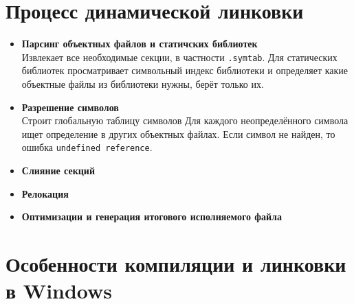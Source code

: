 \documentclass{article}
\begin{document}
\section{Процесс динамической линковки}
\begin{itemize}
\item \textbf{Парсинг объектных файлов и статичских библиотек}\\
Извлекает все необходимые секции, в частности \texttt{.symtab}. Для статических библиотек просматривает символьный индекс библиотеки и определяет какие объектные файлы из библиотеки нужны, берёт только их.

\item \textbf{Разрешение символов}\\
Строит глобальную таблицу символов
Для каждого неопределённого символа ищет определение в других объектных файлах.
Если символ не найден, то ошибка \texttt{undefined reference}.

\item \textbf{Слияние секций}\\

\item \textbf{Релокация}\\

\item \textbf{Оптимизации и генерация итогового исполняемого файла}\\

\end{itemize}


\section{Особенности компиляции и линковки в Windows}
\end{document}
